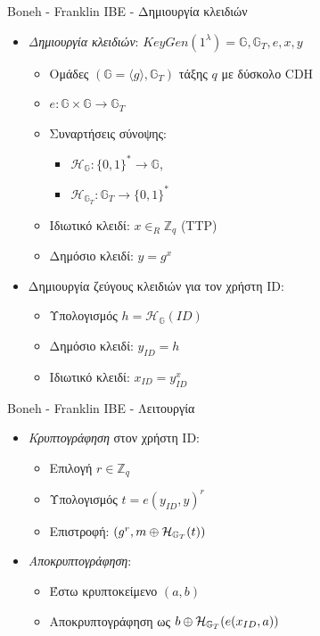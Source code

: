 \documentclass[handout]{beamer}
\begin{document}
\begin{frame}{Boneh - Franklin IBE - Δημιουργία κλειδιών}
	\begin{itemize}
		\item \emph{Δημιουργία κλειδιών}: 
		$KeyGen(1^\lambda) = \mathbb{G},\mathbb{G}_T, e, x, y$ \pause
		\begin{itemize}
			\item Ομάδες $(\mathbb{G} = \langle g \rangle,\mathbb{G}_T)$ τάξης $q$ με δύσκολο CDH \pause
			\item $e: \mathbb{G} \times \mathbb{G} \rightarrow \mathbb{G}_T$ \pause
			\item Συναρτήσεις σύνοψης: 
			\begin{itemize}
				\item $\mathcal{H}_{\mathbb{G}}:\{0,1\}^* \rightarrow \mathbb{G}$,
				\item  $\mathcal{H}_{\mathbb{G}_T}: \mathbb{G}_Τ \rightarrow \{0,1\}^*$ \pause
			\end{itemize} 
			\item Ιδιωτικό κλειδί: $x \in_R \mathbb{Z}_q$ (TTP) \pause
			\item Δημόσιο κλειδί: $y = g^x$			
		\end{itemize}
		\item Δημιουργία ζεύγους κλειδιών για τον χρήστη ID: \pause
		\begin{itemize}
			\item Υπολογισμός $h = \mathcal{H}_{\mathbb{G}}(ID)$ \pause
			\item Δημόσιο κλειδί: $y_{ID} = h$ \pause
			\item Ιδιωτικό κλειδί:  $x_{ID} = y_{ID}^x$
		\end{itemize}
	\end{itemize}
\end{frame}

\begin{frame}{Boneh - Franklin IBE - Λειτουργία}
	\begin{itemize}
		\item \emph{Κρυπτογράφηση} στον χρήστη ID:  \pause
		\begin{itemize}			
			\item Επιλογή $r \in \mathbb{Z}_q$ \pause
			\item Υπολογισμός $t = e(y_{ID},y)^r$ \pause
			\item Επιστροφή:  $(g^r, m \oplus \mathcal{H}_{\mathbb{G}_T}(t))$
		\end{itemize}
		\item \emph{Αποκρυπτογράφηση}: \pause
		\begin{itemize}
			\item Έστω κρυπτοκείμενο $(a,b)$ \pause
			\item Αποκρυπτογράφηση ως $b \oplus \mathcal{H}_{\mathbb{G}_T}(e(x_{ID},a))$
		\end{itemize}
	\end{itemize}	
\end{frame}	
\end{document}
